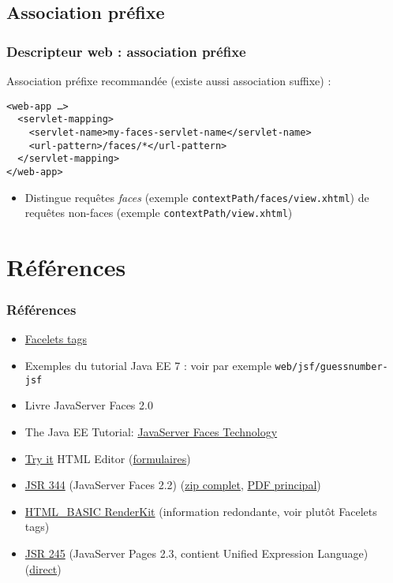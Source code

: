 \documentclass[english, french]{beamer}
\begin{document}
\subsection{Association préfixe}
\begin{frame}[fragile]
	\frametitle{Descripteur web : association préfixe}
	Association préfixe recommandée {\tiny (existe aussi association suffixe)} :
	\begin{lstlisting}[aboveskip=1em, belowskip=1em]
<web-app …>
  <servlet-mapping>
    <servlet-name>my-faces-servlet-name</servlet-name>
    <url-pattern>/faces/*</url-pattern>
  </servlet-mapping>
</web-app>
	\end{lstlisting}
	\begin{itemize}
		\item Distingue requêtes \emph{faces} (exemple \texttt{contextPath/faces/view.xhtml}) de requêtes non-faces (exemple \texttt{contextPath/view.xhtml})
	\end{itemize}
\end{frame}

\section{Références}
\begin{frame}
	\frametitle{Références}
	\begin{itemize}
		\item \href{https://docs.oracle.com/javaee/7/javaserver-faces-2-2/vdldocs-facelets/toc.htm}{Facelets tags}
		\item Exemples du tutorial Java EE 7 : voir par exemple \texttt{web/jsf/guessnumber-jsf}
		\item Livre JavaServer Faces 2.0
		\item The Java EE Tutorial: \href{https://docs.oracle.com/javaee/7/tutorial/jsf-intro.htm}{JavaServer Faces Technology}
		\item \href{https://www.w3schools.com/tags/tryit.asp?filename=tryhtml_basic}{Try it} HTML Editor (\href{https://www.w3schools.com/tags/tryit.asp?filename=tryhtml_form_method}{formulaires})
		\item \href{https://jcp.org/en/jsr/detail?id=344}{JSR 344} (JavaServer Faces 2.2) (\href{http://download.oracle.com/otn-pub/jcp/jsf-2_2-fr-eval-spec/javax.faces-api-2.2-FINAL.zip}{zip complet}, \href{http://www.sws.bfh.ch/~fischli/courses/eadj/jsf/doc/JSF_20130320.pdf}{PDF principal})
		\item \href{https://docs.oracle.com/javaee/7/javaserver-faces-2-2/renderkitdocs/toc.htm}{HTML\_BASIC RenderKit} (information redondante, voir plutôt Facelets tags)
		\item \href{https://jcp.org/en/jsr/detail?id=245}{JSR 245} (JavaServer Pages 2.3, contient Unified Expression Language) (\href{http://download.oracle.com/otn-pub/jcp/jsp-2_3-mrel2-eval-spec/JSP2.3MR.pdf}{direct})
	\end{itemize}
\end{frame}
\end{document}
